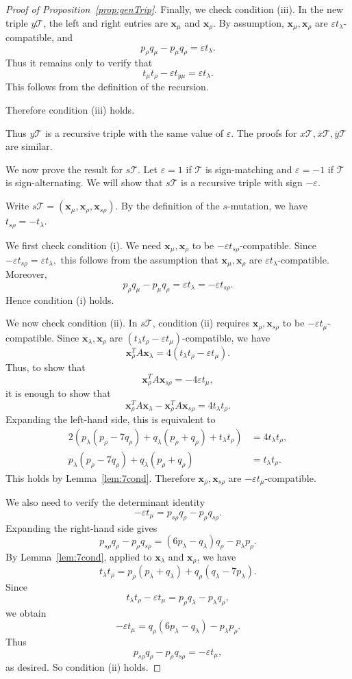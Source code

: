\documentclass[11pt, reqno]{amsart}
\theoremstyle{remark}
\numberwithin{equation}{subsection}
\numberwithin{figure}{section}
\theoremstyle{customremark}
\newcommand{\Tt}{\mathcal{T}}
\newcommand{\ov}{\overline}
\newcommand{\eps}{\varepsilon}
\begin{document}
\begin{proof}[Proof of Proposition~\ref{prop:genTrip}]
Finally, we check condition (iii). In the new triple $y\Tt$, the left and right entries are $\bm{x}_\mu$ and $\bm{x}_\rho$. By assumption, $\bm{x}_\mu,\bm{x}_\rho$ are $\eps t_\lambda$-compatible, and
\[
p_\rho q_\mu-p_\mu q_\rho=\eps t_\lambda.
\]
Thus it remains only to verify that
\[
t_\mu t_\rho-\eps t_{y\mu}=\eps t_\lambda.
\]
This follows from the definition of the recursion. 

Therefore condition (iii) holds.

Thus $y\Tt$ is a recursive triple with the same value of $\eps$. The proofs for $x\Tt,\ov{x}\Tt,\ov{y}\Tt$ are similar.


    We now prove the result for $s\Tt$. Let $\eps=1$ if $\Tt$ is sign-matching and $\eps=-1$ if $\Tt$ is sign-alternating. We will show that $s\Tt$ is a recursive triple with sign $-\eps$.

Write $s\Tt=(\bm{x}_\mu,\bm{x}_\rho,\bm{x}_{s\rho}).$
By the definition of the $s$-mutation, we have $t_{s\rho}=-t_\lambda.$

We first check condition (i). We need $\bm{x}_\mu,\bm{x}_\rho$ to be $-\eps t_{s\rho}$-compatible. Since $-\eps t_{s\rho}=\eps t_\lambda,$ 
this follows from the assumption that $\bm{x}_\mu,\bm{x}_\rho$ are $\eps t_\lambda$-compatible. Moreover,
\[
p_\rho q_\mu-p_\mu q_\rho=\eps t_\lambda=-\eps t_{s\rho}.
\]
Hence condition (i) holds.

We now check condition (ii). In $s\Tt$, condition (ii) requires $\bm{x}_\rho,\bm{x}_{s\rho}$ to be $-\eps t_\mu$-compatible. Since $\bm{x}_\lambda,\bm{x}_\rho$ are $(t_\lambda t_\rho-\eps t_\mu)$-compatible, we have
\[
\bm{x}_\rho^TA\bm{x}_\lambda=4(t_\lambda t_\rho-\eps t_\mu).
\]
Thus, to show that
\[
\bm{x}_\rho^TA\bm{x}_{s\rho}=-4\eps t_\mu,
\]
it is enough to show that
\[
\bm{x}_\rho^TA\bm{x}_\lambda-\bm{x}_\rho^TA\bm{x}_{s\rho}=4t_\lambda t_\rho.
\]
Expanding the left-hand side, this is equivalent to
\begin{align*}
2(p_\lambda(p_\rho-7q_\rho)+q_\lambda(p_\rho+q_\rho)+t_\lambda t_\rho)
&=4t_\lambda t_\rho,\\
p_\lambda(p_\rho-7q_\rho)+q_\lambda(p_\rho+q_\rho)
&=t_\lambda t_\rho.
\end{align*}
This holds by Lemma~\ref{lem:7cond}. Therefore $\bm{x}_\rho,\bm{x}_{s\rho}$ are $-\eps t_\mu$-compatible.

We also need to verify the determinant identity
\[
-\eps t_\mu=p_{s\rho}q_\rho-p_\rho q_{s\rho}.
\]
Expanding the right-hand side gives
\[
p_{s\rho}q_\rho-p_\rho q_{s\rho}
=(6p_\lambda-q_\lambda)q_\rho-p_\lambda p_\rho.
\]
By Lemma~\ref{lem:7cond}, applied to $\bm{x}_\lambda$ and $\bm{x}_\rho$, we have
\[
t_\lambda t_\rho
=
p_\rho(p_\lambda+q_\lambda)+q_\rho(q_\lambda-7p_\lambda).
\]
Since
\[
t_\lambda t_\rho-\eps t_\mu=p_\rho q_\lambda-p_\lambda q_\rho,
\]
we obtain
\[
-\eps t_\mu
=
q_\rho(6p_\lambda-q_\lambda)-p_\lambda p_\rho.
\]
Thus
\[
p_{s\rho}q_\rho-p_\rho q_{s\rho}=-\eps t_\mu,
\]
as desired. So condition (ii) holds.


\end{proof}
\end{document}
